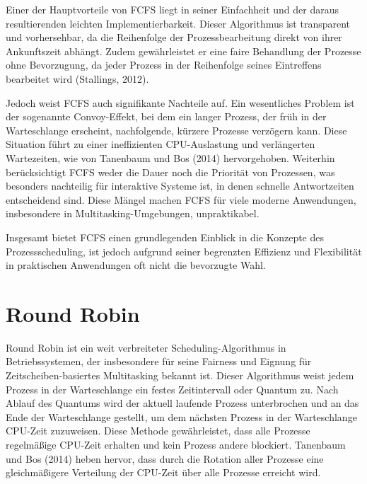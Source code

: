 Einer der Hauptvorteile von FCFS liegt in seiner Einfachheit und der daraus resultierenden leichten Implementierbarkeit. Dieser Algorithmus ist transparent und vorhersehbar, da die Reihenfolge der Prozessbearbeitung direkt von ihrer Ankunftszeit abhängt. Zudem gewährleistet er eine faire Behandlung der Prozesse ohne Bevorzugung, da jeder Prozess in der Reihenfolge seines Eintreffens bearbeitet wird (Stallings, 2012). 

Jedoch weist FCFS auch signifikante Nachteile auf. Ein wesentliches Problem ist der sogenannte Convoy-Effekt, bei dem ein langer Prozess, der früh in der Warteschlange erscheint, nachfolgende, kürzere Prozesse verzögern kann. Diese Situation führt zu einer ineffizienten CPU-Auslastung und verlängerten Wartezeiten, wie von Tanenbaum und Bos (2014) hervorgehoben. Weiterhin berücksichtigt FCFS weder die Dauer noch die Priorität von Prozessen, was besonders nachteilig für interaktive Systeme ist, in denen schnelle Antwortzeiten entscheidend sind. Diese Mängel machen FCFS für viele moderne Anwendungen, insbesondere in Multitasking-Umgebungen, unpraktikabel.

Insgesamt bietet FCFS einen grundlegenden Einblick in die Konzepte des Prozessscheduling, ist jedoch aufgrund seiner begrenzten Effizienz und Flexibilität in praktischen Anwendungen oft nicht die bevorzugte Wahl.


\section{Round Robin}

Round Robin ist ein weit verbreiteter Scheduling-Algorithmus in Betriebssystemen, der insbesondere für seine Fairness und Eignung für Zeitscheiben-basiertes Multitasking bekannt ist. Dieser Algorithmus weist jedem Prozess in der Warteschlange ein festes Zeitintervall oder Quantum zu. Nach Ablauf des Quantums wird der aktuell laufende Prozess unterbrochen und an das Ende der Warteschlange gestellt, um dem nächsten Prozess in der Warteschlange CPU-Zeit zuzuweisen. Diese Methode gewährleistet, dass alle Prozesse regelmäßige CPU-Zeit erhalten und kein Prozess andere blockiert. Tanenbaum und Bos (2014) heben hervor, dass durch die Rotation aller Prozesse eine gleichmäßigere Verteilung der CPU-Zeit über alle Prozesse erreicht wird.

